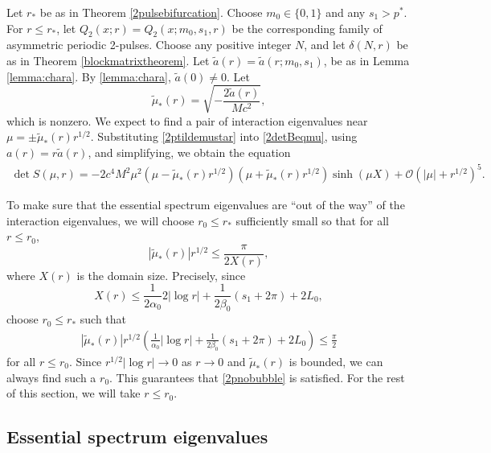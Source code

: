 \documentclass[thesis.tex]{subfiles}
\begin{document}
Let $r_*$ be as in Theorem \ref{2pulsebifurcation}. Choose $m_0 \in \{ 0, 1\}$ and any $s_1 > p^*$. For $r \leq r_*$, let $Q_2(x; r) = Q_2(x; m_0, s_1, r)$ be the corresponding family of asymmetric periodic 2-pulses. Choose any positive integer $N$, and let $\delta(N,r)$ be as in Theorem \ref{blockmatrixtheorem}. Let $\tilde{a}(r) = \tilde{a}(r; m_0, s_1)$, be as in Lemma \cref{lemma:chara}. By \cref{lemma:chara}, $\tilde{a}(0) \neq 0$. Let
\begin{equation}\label{2ptildemustar}
\tilde{\mu}_*(r) = \sqrt{-\frac{2\tilde{a}(r)}{M c^2}},
\end{equation}
which is nonzero. We expect to find a pair of interaction eigenvalues near $\mu = \pm \tilde{\mu}_*(r) r^{1/2}$. Substituting \cref{2ptildemustar} into \cref{2detBeqmu}, using $a(r) = r \tilde{a}(r)$, and simplifying, we obtain the equation
\begin{equation}\label{2detBeqmu2}
\begin{aligned}
\det S(\mu, r) = -2 c^4 M^2 \mu^2 (\mu - \tilde{\mu}_*(r)r^{1/2})(\mu + \tilde{\mu}_*(r)r^{1/2}) \sinh(\mu X) + \mathcal{O}(|\mu| + r^{1/2})^5.
\end{aligned}
\end{equation}

To make sure that the essential spectrum eigenvalues are ``out of the way'' of the interaction eigenvalues, we will choose $r_0 \leq r_*$ sufficiently small so that for all $r \leq r_0$,
\begin{equation}\label{2pnobubble}
\left|\tilde{\mu}_*(r) \right| r^{1/2}  \leq \frac{\pi}{2 X(r)},
\end{equation}
where $X(r)$ is the domain size. Precisely, since
\[
X(r) \leq \frac{1}{2 \alpha_0} 2 |\log r| + \frac{1}{2\beta_0}\left( s_1 + 2 \pi \right) + 2 L_0, 
\]
choose $r_0 \leq r_*$ such that
\begin{align}\label{2pnobubblecond}
\left|\tilde{\mu}_*(r) \right| r^{1/2} \left( \frac{1}{\alpha_0} |\log r| + \frac{1}{2\beta_0}\left( s_1 + 2 \pi \right) + 2 L_0 \right) \leq \frac{\pi}{2}
\end{align}
for all $r \leq r_0$. Since $r^{1/2}|\log r| \rightarrow 0$ as $r \rightarrow 0$ and $\tilde{\mu}_*(r)$ is bounded, we can always find such a $r_0$. This guarantees that \cref{2pnobubble} is satisfied. For the rest of this section, we will take $r \leq r_0$.

\subsection{Essential spectrum eigenvalues}
\end{document}
